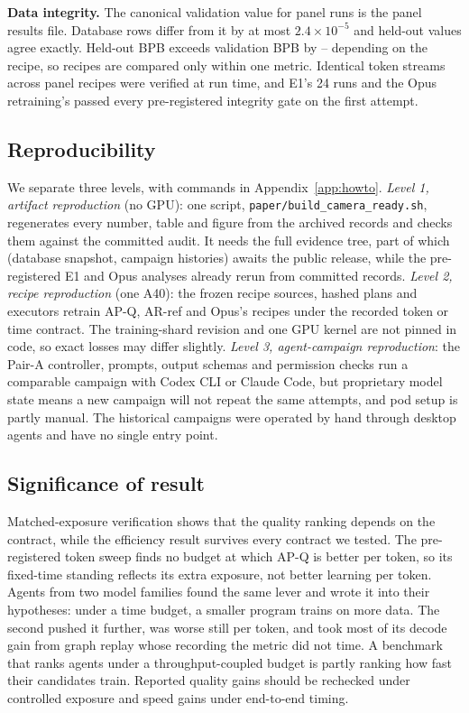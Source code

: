 \documentclass{article}
\newif\ifshowhumanmarkers \showhumanmarkersfalse
\newcommand{\humantag}[1]{{\color{humanframe}\sffamily\scriptsize\bfseries HUMAN AUTHOR MUST REWRITE/VERIFY [#1]}\ }
\newcommand{\humanauthor}[2][]{\ifshowhumanmarkers\begin{humanbox}\humantag{#1}#2\end{humanbox}\else #2\par\fi}
\begin{document}
\humanauthor[P2-11]{\textbf{Data integrity.} The canonical validation value for panel runs is the panel results file. Database rows differ from it by at most $2.4\times10^{-5}$ and held-out values agree exactly. Held-out BPB exceeds validation BPB by \CRHeldValOffLo--\CRHeldValOffHi{} depending on the recipe, so recipes are compared only within one metric. Identical token streams across panel recipes were verified at run time, and E1's 24 runs and the Opus retraining's \CRMTRuns{} passed every pre-registered integrity gate on the first attempt.}

\subsection{Reproducibility}\label{sec:reproduce}
\humanauthor[P2-17]{We separate three levels, with commands in Appendix~\ref{app:howto}. \emph{Level 1, artifact reproduction} (no GPU): one script, \texttt{paper/build\_camera\_ready.sh}, regenerates every number, table and figure from the archived records and checks them against the committed audit. It needs the full evidence tree, part of which (database snapshot, campaign histories) awaits the public release, while the pre-registered E1 and Opus analyses already rerun from committed records. \emph{Level 2, recipe reproduction} (one A40): the frozen recipe sources, hashed plans and executors retrain AP-Q, AR-ref and Opus's recipes under the recorded token or time contract. The training-shard revision and one GPU kernel are not pinned in code, so exact losses may differ slightly. \emph{Level 3, agent-campaign reproduction}: the Pair-A controller, prompts, output schemas and permission checks run a comparable campaign with Codex CLI or Claude Code, but proprietary model state means a new campaign will not repeat the same attempts, and pod setup is partly manual. The historical campaigns were operated by hand through desktop agents and have no single entry point.}

\subsection{Significance of result}
\humanauthor[P2-12]{Matched-exposure verification shows that the quality ranking depends on the contract, while the efficiency result survives every contract we tested. The pre-registered token sweep finds no budget at which AP-Q is better per token, so its fixed-time standing reflects its extra exposure, not better learning per token. Agents from two model families found the same lever and wrote it into their hypotheses: under a time budget, a smaller program trains on more data. The second pushed it further, was worse still per token, and took most of its decode gain from graph replay whose recording the metric did not time. A benchmark that ranks agents under a throughput-coupled budget is partly ranking how fast their candidates train. Reported quality gains should be rechecked under controlled exposure and speed gains under end-to-end timing.}
\end{document}
